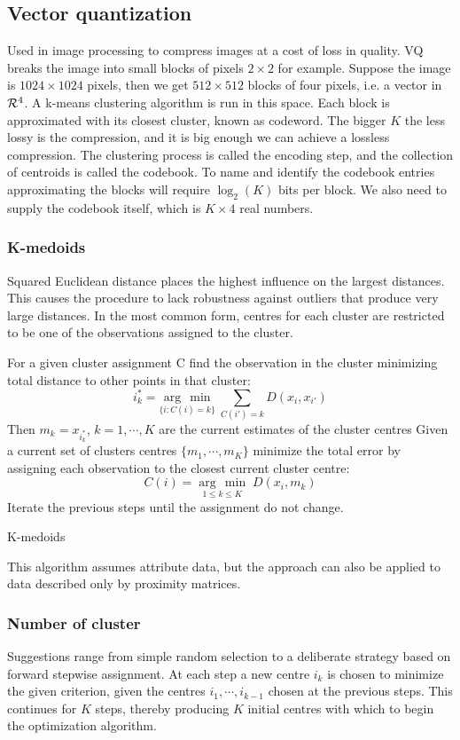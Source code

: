 \documentclass[12pt, letterpaper]{article}
\theoremstyle{definition}
\newcommand{\argmin}[1]{\underset{#1}{\operatorname{arg}\,\operatorname{min}}\;}
\begin{document}
\subsection{Vector quantization}
Used in image processing to compress images at a cost of loss in quality. VQ breaks the image into small blocks of pixels $2 \times 2$ for example. Suppose the image is $1024 \times 1024$ pixels, then we get $512\times 512$ blocks of four pixels, i.e. a vector in $\CMcal{R}^4$. A k-means clustering algorithm is run in this space.  Each block is approximated with its closest cluster, known as codeword. The bigger $K$ the less lossy is the compression, and it is big enough we can achieve a lossless compression. The clustering process is called the encoding step, and the collection of centroids is called the codebook. To name and identify the codebook entries approximating the blocks will require $\log_2(K)$ bits per block. We also need to supply the codebook itself, which is $K \times 4$ real numbers.

\subsubsection{K-medoids}
Squared Euclidean distance places the highest influence on the largest distances. This causes the procedure to lack robustness against outliers that produce very large distances.  In the most common form, centres for each cluster are restricted to be one of the observations assigned to the cluster.
\begin{algorithm}
For a given cluster assignment C find the observation in the cluster
minimizing total distance to other points in that cluster:
\begin{equation}
i_k^* = \argmin{\{i:C(i) = k\}} \sum_{C(i')=k}D(x_i, x_{i'})
\end{equation}
Then $m_k=x_{i_k^*}$, $k=1,\cdots, K$ are the current estimates of the cluster centres\;
Given a current set of clusters centres $\{m_1, \cdots, m_K\}$ minimize the total error by assigning each observation to the closest current cluster centre:
\begin{equation}
C(i) = \argmin{1\le k\le K}{D(x_i, m_k)}
\end{equation}\;
Iterate the previous steps until the assignment do not change.
\caption{K-medoids}
\end{algorithm}
This algorithm assumes attribute data, but the approach can also be applied to data described only by proximity matrices.

\subsubsection{Number of cluster}
Suggestions range from simple random selection to a deliberate strategy based on forward stepwise assignment. At each step a new centre $i_k$ is chosen to minimize the given criterion, given the centres $i_1, \cdots, i_{k-1}$ chosen at the previous steps. This continues for $K$ steps, thereby producing $K$ initial centres with which to begin the optimization algorithm.
\end{document}
